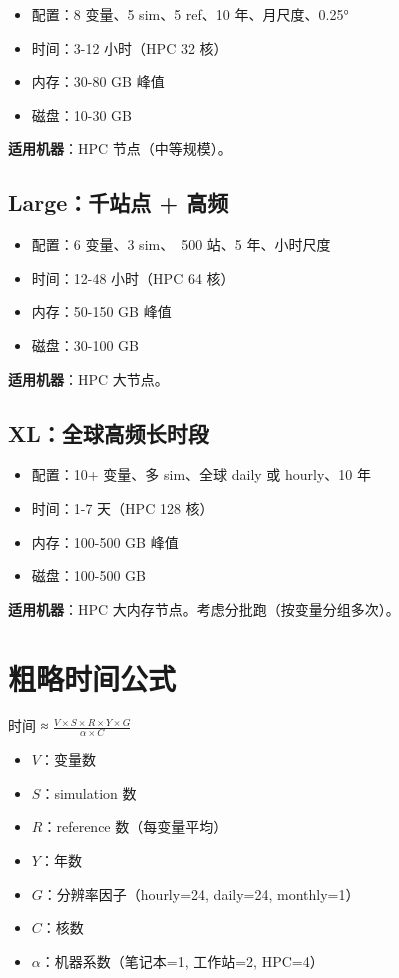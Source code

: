 \begin{itemize}
  \item 配置：8 变量、5 sim、5 ref、10 年、月尺度、0.25°
  \item 时间：3-12 小时（HPC 32 核）
  \item 内存：30-80 GB 峰值
  \item 磁盘：10-30 GB
\end{itemize}

\textbf{适用机器}：HPC 节点（中等规模）。

\subsection{Large：千站点 + 高频}

\begin{itemize}
  \item 配置：6 变量、3 sim、~500 站、5 年、小时尺度
  \item 时间：12-48 小时（HPC 64 核）
  \item 内存：50-150 GB 峰值
  \item 磁盘：30-100 GB
\end{itemize}

\textbf{适用机器}：HPC 大节点。

\subsection{XL：全球高频长时段}

\begin{itemize}
  \item 配置：10+ 变量、多 sim、全球 daily 或 hourly、10 年
  \item 时间：1-7 天（HPC 128 核）
  \item 内存：100-500 GB 峰值
  \item 磁盘：100-500 GB
\end{itemize}

\textbf{适用机器}：HPC 大内存节点。考虑分批跑（按变量分组多次）。

\section{粗略时间公式}

时间 ≈ \(\frac{V \times S \times R \times Y \times G}{\alpha \times C}\)

\begin{itemize}
  \item \(V\)：变量数
  \item \(S\)：simulation 数
  \item \(R\)：reference 数（每变量平均）
  \item \(Y\)：年数
  \item \(G\)：分辨率因子（hourly=24, daily=24, monthly=1）
  \item \(C\)：核数
  \item \(\alpha\)：机器系数（笔记本=1, 工作站=2, HPC=4）
\end{itemize}

